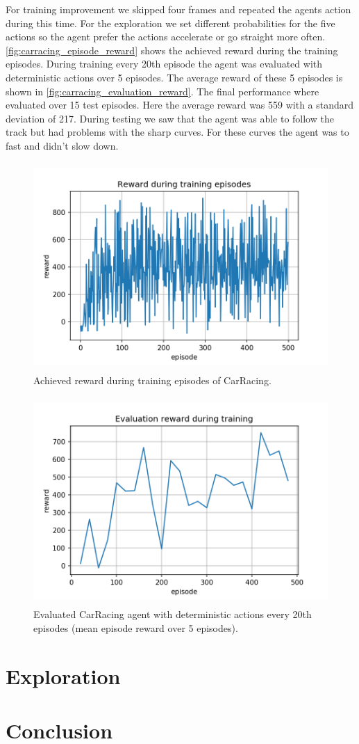 \documentclass[a4paper,12pt]{article}
\begin{document}
For training improvement we skipped four frames and repeated the agents action during this time. For the exploration we set different probabilities for the five actions so the agent prefer the actions accelerate or go straight more often.\\

\autoref{fig:carracing_episode_reward} shows the achieved reward during the training episodes. During training every 20th episode the agent was evaluated with deterministic actions over 5 episodes. The average reward of these 5 episodes is shown in \autoref{fig:carracing_evaluation_reward}. The final performance where evaluated over 15 test episodes. Here the average reward was 559 with a standard deviation of 217. During testing we saw that the agent was able to follow the track but had problems with the sharp curves. For these curves the agent was to fast and didn't slow down.

\begin{figure}[H]
	\centering \includegraphics[width=11.70cm, height=7.9cm]{plots/carracing_episode_reward.png}
	\caption{
		\label{fig:carracing_episode_reward}
		Achieved reward during training episodes of CarRacing.
	}
\end{figure}

\begin{figure}[H]
	\centering \includegraphics[width=11.70cm, height=7.9cm]{plots/carracing_evaluation_reward.png}
	\caption{
		\label{fig:carracing_evaluation_reward}
		Evaluated CarRacing agent with deterministic actions every 20th episodes (mean episode reward over 5 episodes).
	}
\end{figure}

\section{Exploration}

\section{Conclusion}
\end{document}
